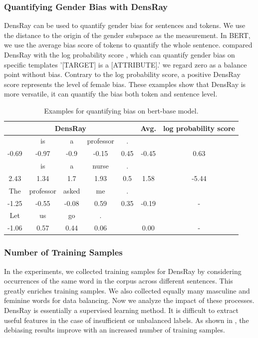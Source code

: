 \subsubsection{Quantifying Gender Bias with DensRay}
DensRay can be used to quantify gender bias for sentences and tokens. We use the distance to the origin of the gender subspace as the measurement. In BERT, we use the average bias score of tokens to quantify the whole sentence.  compared DensRay with the log probability score \cite{kurita2019measuring}, which can quantify gender bias on specific templates '[TARGET] is a [ATTRIBUTE].' we regard zero as a balance point without bias. Contrary to the log probability score, a positive DensRay score represents the level of female bias. These examples show that DensRay is more versatile, it can quantify the bias both token and sentence level.
\begin{table}[h]
	\centering
	\scriptsize
	\begin{tabular}{ccccccc}
		\hline
		\multicolumn{5}{c}{DensRay}&Avg.&log probability score\\		
		\hline
		[MASK] &is &a &professor& . &&\\
		-0.69 &-0.97 &-0.9  &-0.15  &0.45& -0.45& 0.63\\
		\hline
		[MASK] &is &a &nurse& . &&\\
		2.43  &1.34  &1.7   &1.93  &0.5& 1.58 &-5.44\\
		\hline
		The &professor &asked &me& . &&\\
		-1.25 &-0.55 &-0.08  &0.59  &0.35 &-0.19 &-\\
		\hline
		Let &us &go &.& &&\\
		-1.06  &0.57  &0.44  &0.06& &0.00 &-\\
		\hline
	\end{tabular}
	\caption{
		Examples for quantifying bias on bert-base model.}
\end{table}



\subsubsection{Number of Training Samples}
In the experiments, we collected training samples for DensRay by considering occurrences of the same word in the corpus across different sentences. This greatly enriches training samples. We also collected equally many masculine and feminine words for data balancing. Now we analyze the impact of these processes. DensRay is essentially a supervised learning method. It is difficult to extract useful features in the case of insufficient or unbalanced labels.  As shown in , the debiasing results improve with an increased number of training samples.


